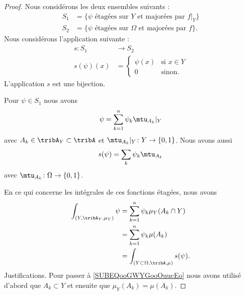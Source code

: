 \begin{proof}
	Nous considérons les deux ensembles suivants :
	\begin{subequations}
		\begin{align}
			S_1 & =\{ \psi\text{ étagées sur } Y\text{ et majorées par } f|_Y \}    \\
			S_2 & =\{ \psi\text{ étagées sur } \Omega\text{ et majorées par } f \}.
		\end{align}
	\end{subequations}
	Nous considérons l'application suivante :
	\begin{equation}
		\begin{aligned}
			s\colon S_1 & \to S_2                      \\
			s(\psi)(x)  & =\begin{cases}
				\psi(x) & \text{si } x\in Y \\
				0       & \text{sinon.}
			\end{cases}
		\end{aligned}
	\end{equation}
	L'application \( s\) est une bijection.

	Pour \( \psi\in S_1\) nous avons
	\begin{equation}
		\psi=\sum_{k=1}^n\psi_k\mtu_{A_k}|_Y
	\end{equation}
	avec \( A_k\in \tribA_Y\subset \tribA\) et \( \mtu_{A_k}|_Y\colon Y\to \{ 0,1 \}\). Nous avons aussi
	\begin{equation}
		s(\psi)=\sum_{k}\psi_k\mtu_{A_k}
	\end{equation}
	avec \( \mtu_{A_k}\colon \Omega\to \{ 0,1 \}\).

	En ce qui concerne les intégrales de ces fonctions étagées, nous avons
	\begin{subequations}
		\begin{align}
			\int_{(Y,\tribA_Y,\mu_Y)}\psi & =\sum_{k=1}^n\psi_k\mu_Y(A_k\cap Y)                     \\
			                              & =\sum_{k=1}^n\psi_k\mu(A_k) \label{SUBEQooGWYGooOuucEo} \\
			                              & =\int_{(Y\subset \Omega,\tribA,\mu)}s(\psi).
		\end{align}
	\end{subequations}
	Justifications. Pour passer à \eqref{SUBEQooGWYGooOuucEo} nous avons utilisé d'abord que \( A_k\subset Y\) et ensuite que \( \mu_Y(A_k)=\mu(A_k)\).


\end{proof}
